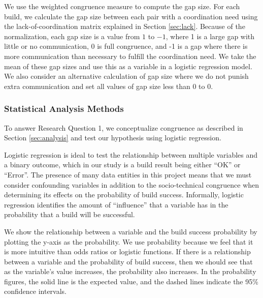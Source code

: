 We use the weighted congruence measure to compute the gap size. For each build, we calculate the gap size between each pair with a coordination need using the lack-of-coordination matrix explained in Section \ref{sec:lack}. Because of the normalization, each gap size is a value from $1$ to $-1$, where 1 is a large gap with little or no communication, 0 is full congruence, and -1 is a gap where there is more communication than necessary to fulfill the coordination need. We take the mean of these gap sizes and use this as a variable in a logistic regression model. We also consider an alternative calculation of gap size where we do not punish extra communication and set all values of gap size less than 0 to 0.

\subsubsection{Statistical Analysis Methods}


To answer Research Question 1, we conceptualize congruence as described in Section \ref{sec:analysis} and test our hypothesis using logistic regression.

Logistic regression is ideal to test the relationship between multiple variables and a binary outcome, which in our study is a build result being either ``OK'' or ``Error''. The presence of many data entities in this project means that we must consider confounding variables in addition to the socio-technical congruence when determining its effects on the probability of build success. Informally, logistic regression identifies the amount of ``influence'' that a variable has in the probability that a build will be successful.

We show the relationship between a variable and the build success probability by plotting the y-axis as the probability. We use probability because we feel that it is more intuitive than odds ratios or logistic functions. If there is a relationship between a variable and the probability of build success, then we should see that as the variable's value increases, the probability also increases. In the probability figures, the solid line is the expected value, and the dashed lines indicate the 95\% confidence intervals.

